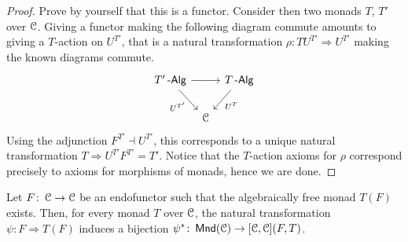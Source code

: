 \documentclass[a4paper,11pt,oneside,openany]{scrbook}
\begin{document}
\begin{proof}
	Prove by yourself that this is a functor. Consider then two monads $T$, $T'$
    over $\operatorname{\mathcal{C}}$. Giving a functor making the following diagram commute amounts to
    giving a $T$-action on $U^{T'}$, that is a natural transformation
    $\rho\colon TU^{T'}\Rightarrow U^{T'}$ making the known diagrams commute.
	\[
		\begin{tikzcd}[column sep=tiny]
			T'\Alg\ar[rr]\ar[dr, swap, "U^{T'}"]
			&& T\Alg\ar[dl, "U^T"] \\
			& \C
		\end{tikzcd}
	\]
	Using the adjunction $F^{T'}\dashv U^{T'}$, this corresponds to a unique natural transformation $T\Rightarrow U^{T'}F^{T'}=T'$. Notice that the $T$-action axioms for $\rho$ correspond precisely to axioms for morphisms of monads, hence we are done.
\end{proof}

\begin{prop}
	Let $F\colon\operatorname{\mathcal{C}}\rightarrow\operatorname{\mathcal{C}}$ be an endofunctor such that the algebraically free monad $T(F)$ exists. Then, for every monad $T$ over $\operatorname{\mathcal{C}}$, the natural transformation $\psi\colon F\Rightarrow T(F)$ induces a bijection $\psi^*\colon\operatorname{\mathsf{Mnd}}(\operatorname{\mathcal{C}})\rightarrow [\operatorname{\mathcal{C}},\operatorname{\mathcal{C}}](F,T)$.
\end{prop}
\end{document}
